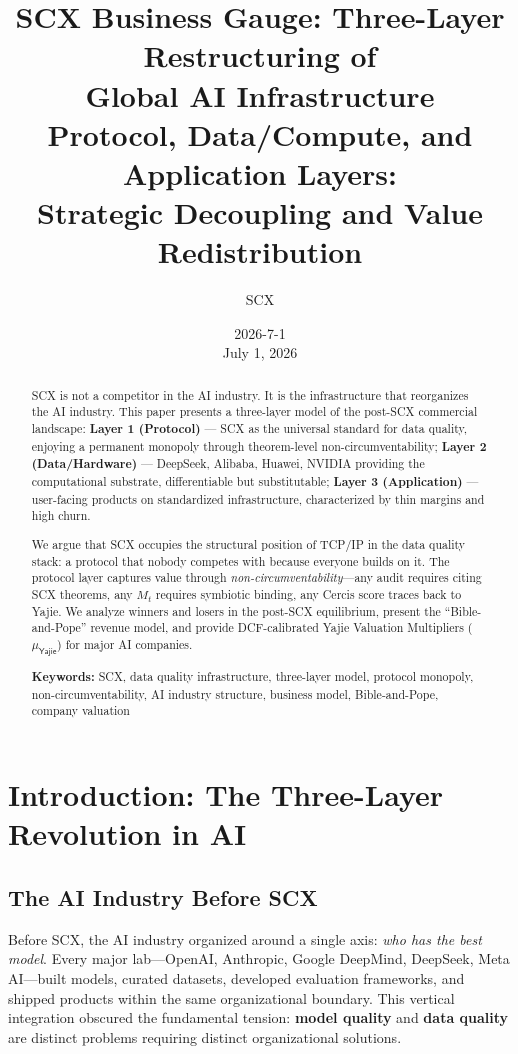 \documentclass[12pt,a4paper]{article}
\title{\textbf{SCX Business Gauge: Three-Layer Restructuring of\\Global AI Infrastructure}\\[8pt]
       \large Protocol, Data/Compute, and Application Layers:\\Strategic Decoupling and Value Redistribution}\\[6pt]
\author{SCX}
\date{2026-7-1 \\ July 1, 2026}
\theoremstyle{remark}
\newcommand{\Yajie}{\textsf{Yajie}}
\begin{document}
\maketitle
\begin{abstract}
\noindent
SCX is not a competitor in the AI industry. It is the infrastructure that reorganizes the AI industry. This paper presents a three-layer model of the post-SCX commercial landscape: \textbf{Layer 1 (Protocol)} --- SCX as the universal standard for data quality, enjoying a permanent monopoly through theorem-level non-circumventability; \textbf{Layer 2 (Data/Hardware)} --- DeepSeek, Alibaba, Huawei, NVIDIA providing the computational substrate, differentiable but substitutable; \textbf{Layer 3 (Application)} --- user-facing products on standardized infrastructure, characterized by thin margins and high churn.

We argue that SCX occupies the structural position of TCP/IP in the data quality stack: a protocol that nobody competes with because everyone builds on it. The protocol layer captures value through \textit{non-circumventability}---any audit requires citing SCX theorems, any \(M_t\) requires symbiotic binding, any Cercis score traces back to Yajie. We analyze winners and losers in the post-SCX equilibrium, present the ``Bible-and-Pope'' revenue model, and provide DCF-calibrated Yajie Valuation Multipliers (\(\mu_{\Yajie}\)) for major AI companies.

\medskip
\noindent\textbf{Keywords:} SCX, data quality infrastructure, three-layer model, protocol monopoly, non-circumventability, AI industry structure, business model, Bible-and-Pope, company valuation
\end{abstract}
\newpage
\tableofcontents
\newpage
\section{Introduction: The Three-Layer Revolution in AI}
\subsection{The AI Industry Before SCX}
Before SCX, the AI industry organized around a single axis: \textit{who has the best model}. Every major lab---OpenAI, Anthropic, Google DeepMind, DeepSeek, Meta AI---built models, curated datasets, developed evaluation frameworks, and shipped products within the same organizational boundary. This vertical integration obscured the fundamental tension: \textbf{model quality} and \textbf{data quality} are distinct problems requiring distinct organizational solutions.
\end{document}
